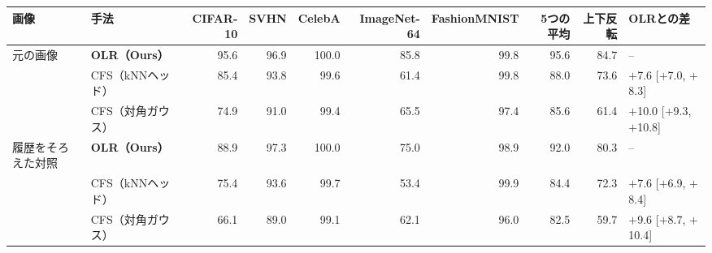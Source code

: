 \documentclass[border=3pt]{standalone}
\begin{document}
%
\begin{tabular}{ll*{5}{r}rrl}%
\toprule
画像 & 手法 & CIFAR-10 & SVHN & CelebA & ImageNet-64 & FashionMNIST & 5つの平均 & 上下反転 & OLRとの差\\
\midrule
元の画像 & \textbf{OLR（Ours）} & 95.6 & 96.9 & 100.0 & 85.8 & 99.8 & 95.6 & 84.7 & –\\
 & CFS（kNNヘッド） & 85.4 & 93.8 & 99.6 & 61.4 & 99.8 & 88.0 & 73.6 & $+$7.6 [$+$7.0, $+$8.3]\\
 & CFS（対角ガウス） & 74.9 & 91.0 & 99.4 & 65.5 & 97.4 & 85.6 & 61.4 & $+$10.0 [$+$9.3, $+$10.8]\\
\midrule
履歴をそろえた対照 & \textbf{OLR（Ours）} & 88.9 & 97.3 & 100.0 & 75.0 & 98.9 & 92.0 & 80.3 & –\\
 & CFS（kNNヘッド） & 75.4 & 93.6 & 99.7 & 53.4 & 99.9 & 84.4 & 72.3 & $+$7.6 [$+$6.9, $+$8.4]\\
 & CFS（対角ガウス） & 66.1 & 89.0 & 99.1 & 62.1 & 96.0 & 82.5 & 59.7 & $+$9.6 [$+$8.7, $+$10.4]\\
\bottomrule
\end{tabular}%
\end{document}
